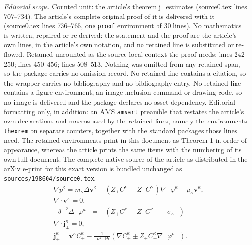 \documentclass[10pt,a4paper]{amsart}
\begin{document}
\noindent\textit{Editorial scope.} Counted unit: the article's theorem j\_estimates (source0.tex lines 707--734). The article's complete original proof of it is delivered with it (source0.tex lines 736--765, one \texttt{proof} environment of 30 lines). No mathematics is written, repaired or re-derived: the statement and the proof are the article's own lines, in the article's own notation, and no retained line is substituted or re-flowed.  Retained uncounted as the source-local context the proof needs: lines 242--250; lines 450--456; lines 508--513.  Nothing was omitted from any retained span, so the package carries no omission record.  No retained line contains a citation, so the wrapper carries no bibliography and no bibliography entry.  No retained line contains a figure environment, an image-inclusion command or drawing code, so no image is delivered and the package declares no asset dependency.  Editorial formatting only, in addition: an AMS \texttt{amsart} preamble that restates the article's own declarations and macros used by the retained lines, namely the environments \texttt{theorem} on separate counters, together with the standard packages those lines need.  The retained environments print in this document as Theorem 1 in order of appearance, whereas the article prints the same items with the numbering of its own full document.  The complete native source of the article as distributed in the arXiv e-print for this exact version is bundled unchanged as \texttt{sources/198604/source0.tex}.
\begin{equation}\label{Pr_in}
\begin{aligned}
&\nabla {{p}^{\kappa}}=m_{\kappa}\Delta {{\mathbf{v}^{\kappa}}}-\left( {{Z}_{+}}C^{\kappa}_{+}-{{Z}_{-}}C^{\kappa}_{-} \right)\nabla {{\text{ }\!\!\varphi^{\kappa}\!\!}}-{\mu}_{\kappa}{{\mathbf{v}^{\kappa}}},\\
&\nabla \cdot {{\mathbf{v}^{\kappa}}}=0,\\
&{{\text{ }\!\!\delta\!\!\text{ }}^{2}}\Delta {{\text{ }\!\!\varphi^{\kappa}\!\!\text{ }}}=-\left( {{Z}_{+}}C^{\kappa}_{+}-{{Z}_{-}}C^{\kappa}_{-}-\text{ }\!\!\sigma_{\kappa}\!\!\text{ } \right)\\					
&\nabla \cdot \mathbf{j}^{\kappa}_{\pm }=0,\\
&\mathbf{j}^{\kappa}_{\pm }={{\mathbf{v}^{\kappa}}}C^{\kappa}_{\pm }-\frac{1}{{{\text{ }\!\!\nu^{\kappa}\!\!\text{ }}}\text{Pe}}\left( \nabla C^{\kappa}_{\pm }\pm {{Z}_{\pm }}C^{\kappa}_{\pm }\nabla {{\text{ }\!\!\varphi^{\kappa}\!\!\text{ }}} \right).
\end{aligned}
\end{equation}
\end{document}
